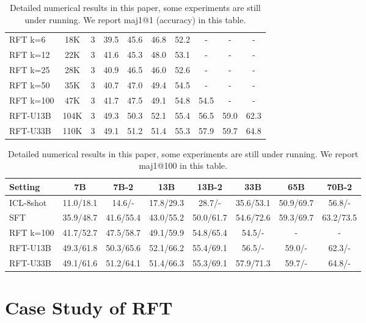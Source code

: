 \documentclass{article} \usepackage{iclr2021_conference,times}
\begin{document}
\begin{table}[ht]
\begin{tabular}{l|cc|ccccccc}
  RFT k=6 & 18K & 3 & 39.5 & 45.6 & 46.8 & 52.2 &-&-&-\\ 
  RFT k=12 & 22K & 3 & 41.6 & 45.3 & 48.0 & 53.1&-&-&-\\ 
  RFT k=25 & 28K & 3 & 40.9 & 46.5 & 46.0 & 52.6 &-&-&-\\ 
  RFT k=50 & 35K & 3 & 40.7 & 47.0 & 49.4 & 54.5  &-&-&-\\ 
  RFT k=100 & 47K & 3 & 41.7 & 47.5 & 49.1 & 54.8 & 54.5&-&- \\
  \hline
  RFT-U13B & 104K & 3 & 49.3 & 50.3 & 52.1 & 55.4 & 56.5 & 59.0&62.3\\
  RFT-U33B & 110K & 3 & 49.1 & 51.2 & 51.4 & 55.3 & 57.9&59.7&64.8\\
  \hline

    \end{tabular}
    \caption{Detailed numerical results in this paper, some experiments are still under running. We report maj1@1 (accuracy) in this table.}
    \label{tab:detailed_results}
\end{table}

\begin{table}[ht]
    \small
    \centering
    \begin{tabular}{l|ccccccc}
  \hline
  Setting & 7B & 7B-2 & 13B & 13B-2  & 33B & 65B & 70B-2 \\
  \hline
  ICL-8shot & 11.0/18.1 & 14.6/- & 17.8/29.3&28.7/-&35.6/53.1&50.9/69.7&56.8/-\\
  SFT &35.9/48.7& 41.6/55.4 & 43.0/55.2 & 50.0/61.7 & 54.6/72.6& 59.3/69.7&63.2/73.5  \\ RFT k=100& 41.7/52.7 & 47.5/58.7 & 49.1/59.9 & 54.8/65.4&54.5/-& -& -  \\
  RFT-U13B&49.3/61.8 & 50.3/65.6 & 52.1/66.2 & 55.4/69.1 & 56.5/- & 59.0/- & 62.3/- \\
  RFT-U33B& 49.1/61.6 & 51.2/64.1 & 51.4/66.3 & 55.3/69.1 & 57.9/71.3 & 59.7/- & 64.8/-  \\
  \hline
    \end{tabular}
    \caption{Detailed numerical results in this paper, some experiments are still under running. We report maj1@100 in this table.}
    \label{tab:detailed_results_100}
\end{table}


\section{Case Study of RFT}
\end{document}
